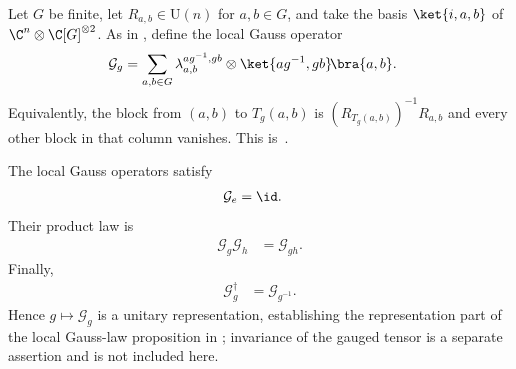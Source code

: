 \begin{definition}
    \label{def:mpug_gauss_operator}
    \leanok
    Let $G$ be finite, let $R_{a,b}\in\mathrm U(n)$ for $a,b\in G$, and take
    the basis $\ket{i,a,b}$ of $\C^n\otimes\C[G]^{\otimes2}$. As in
    \cite[lines~3380--3387]{FrancoRubio2025MPUGauging}, define the local Gauss
    operator
    \begin{align}
        \mathcal G_g
         & =\sum_{a,b\in G}
        \lambda_{a,b}^{ag^{-1},gb}
        \otimes\ket{ag^{-1},gb}\!\bra{a,b}.
        \label{eq:mpug_gauss_operator}
    \end{align}
    Equivalently, the block from $(a,b)$ to $T_g(a,b)$ is
    $(R_{T_g(a,b)})^{-1}R_{a,b}$ and every other block in that column
    vanishes.
    This is~\cite[``Local Gauss operator'']{QICLean2026Blueprint}.
\end{definition}

\begin{lemma}
    \label{thm:mpug_gauss_representation}
    \leanok
    The local Gauss operators satisfy
    \begin{align}
        \mathcal G_e & =\id.
    \end{align}
    Their product law is
    \begin{align}
        \mathcal G_g\mathcal G_h & =\mathcal G_{gh}.
        \label{eq:mpug_gauss_representation}
    \end{align}
    Finally,
    \begin{align}
        \mathcal G_g^\dagger & =\mathcal G_{g^{-1}}.
    \end{align}
    Hence $g\mapsto\mathcal G_g$ is a unitary representation, establishing the
    representation part of the local Gauss-law proposition in
    \cite[lines~3380--3387]{FrancoRubio2025MPUGauging}; invariance of the
    gauged tensor is a separate assertion and is not included here.
\end{lemma}

